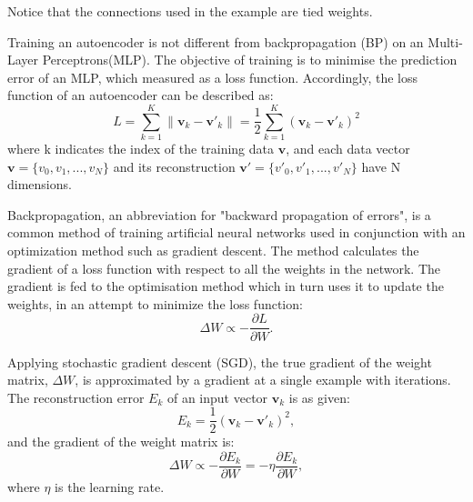 Notice that the connections used in the example are tied weights.

Training an autoencoder is not different from backpropagation (BP) on an Multi-Layer Perceptrons(MLP).
The objective of training is to minimise the prediction error of an MLP, which measured as a loss function.
Accordingly, the loss function of an autoencoder can be described as:
\begin{equation}
L=\sum_{k=1}^{K}\|\mathbf{v}_{k}-\mathbf{v'}_{k}\|=\frac{1}{2}\sum_{k=1}^{K}(\mathbf{v}_{k}-\mathbf{v'}_{k})^{2}
\end{equation}
where k indicates the index of the training data $\mathbf{v}$, and each data vector $\mathbf{v}=\{v_0, v_1,...,v_N\}$ and its reconstruction $\mathbf{v'}=\{v'_0, v'_1,...,v'_N\}$ have N dimensions. 

Backpropagation, an abbreviation for "backward propagation of errors", is a common method of training artificial neural networks used in conjunction with an optimization method such as gradient descent.
The method calculates the gradient of a loss function with respect to all the weights in the network.
The gradient is fed to the optimisation method which in turn uses it to update the weights, in an attempt to minimize the loss function:
\begin{equation}
\Delta W \propto -\frac{\partial L}{\partial W}.
\end{equation}

Applying stochastic gradient descent (SGD), the true gradient of the weight matrix, $\Delta W$, is approximated by a gradient at a single example with iterations.
The reconstruction error $E_k$ of an input vector $\mathbf{v}_k$ is as given:
\begin{equation}
E_k = \frac{1}{2}(\mathbf{v}_k - \mathbf{v'}_k)^2,
\end{equation}
and the gradient of the weight matrix is:
\begin{equation}
\Delta W \propto -\frac{\partial E_k}{\partial W}=-\eta \frac{\partial E_k}{\partial W},
\end{equation}
where $\eta$ is the learning rate.

